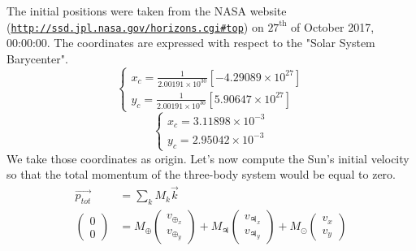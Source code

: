 \documentclass[a4paper, twoside, 11pt]{report}
\theoremstyle{theorem}
\theoremstyle{remark}
\theoremstyle{exemple}
\begin{document}
            The initial positions were taken from the NASA website (\href{{http://ssd.jpl.nasa.gov/horizons.cgi#top}}{\nolinkurl{http://ssd.jpl.nasa.gov/horizons.cgi\#top}}) on $27^{\mathrm{th}}$ of October 2017, 00:00:00. The coordinates are expressed with respect to the "Solar System Barycenter".
                \begin{equation*}
                    \left\{
                        \begin{aligned}
                            x_c = \frac{1}{2.00191 \times 10^{30}} [-4.29089 \times 10^{27}] \\
                            y_c = \frac{1}{2.00191 \times 10^{30}} [5.90647 \times 10^{27}]
                        \end{aligned}
                    \right.
                \end{equation*}
                \begin{equation*}
                    \left\{
                        \begin{aligned}
                            x_c = 3.11898 \times 10^{-3}\\
                            y_c = 2.95042 \times 10^{-3}
                        \end{aligned}
                    \right.
                    \tag{5}
                \end{equation*}
            We take those coordinates as origin. Let's now compute the Sun's initial velocity so that the total momentum of the three-body system would be equal to zero.
                \begin{align*}
                    \vec{p_{tot}} &= \sum\limits_{k} M_k \vec{k} \\
                    \left(\begin{array}{c}
                            0\\
                            0
                    \end{array} \right) &= M_{\oplus} 
                        \left(\begin{array}{c}
                                v_{\oplus_x}\\
                                v_{\oplus_y}
                        \end{array} \right) + M_{\jupiter}
                             \left(\begin{array}{c}
                                    v_{\jupiter_x}\\
                                    v_{\jupiter_y}
                            \end{array} \right) + M_{\odot}
                                \left(\begin{array}{c}
                                        v_x\\
                                        v_y    
                                \end{array} \right)
                \end{align*}
\end{document}

